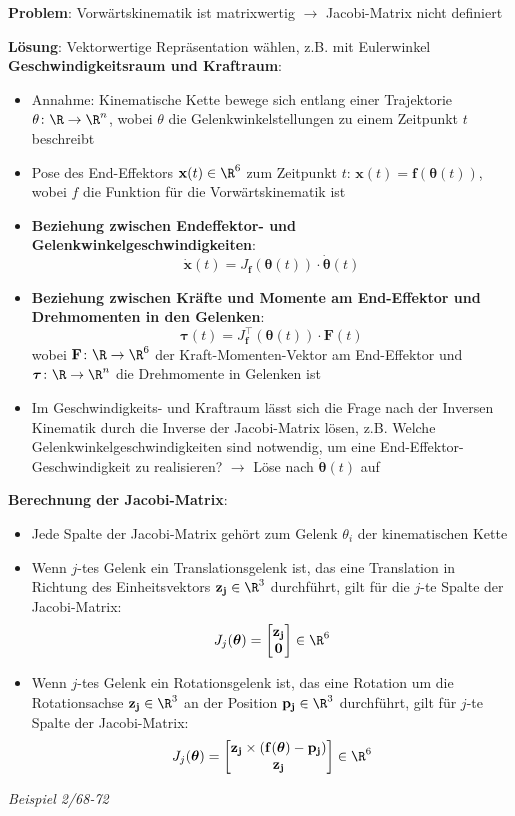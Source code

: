 \textbf{Problem}: Vorwärtskinematik ist matrixwertig $\rightarrow$ Jacobi-Matrix nicht definiert

\textbf{Lösung}: Vektorwertige Repräsentation wählen, z.B. mit Eulerwinkel\\

\textbf{Geschwindigkeitsraum und Kraftraum}:
\begin{itemize}
	\item Annahme: Kinematische Kette bewege sich entlang einer Trajektorie $\theta\colon\R\rightarrow\R^n$, wobei $\theta$ die Gelenkwinkelstellungen zu einem Zeitpunkt $t$ beschreibt
	\item Pose des End-Effektors $\mathbf{x}(t)\in\R^6$ zum Zeitpunkt $t$: $\mathbf{x}(t)=\mathbf{f}(\boldsymbol{\theta}(t))$, wobei $f$ die Funktion für die Vorwärtskinematik ist
	\item \textbf{Beziehung zwischen Endeffektor- und Gelenkwinkelgeschwindigkeiten}: $$\mathbf{\dot{x}}(t)=J_\mathbf{f}(\boldsymbol{\theta}(t))\cdot\boldsymbol{\dot{\theta}}(t)$$
	\item \textbf{Beziehung zwischen Kräfte und Momente am End-Effektor und Drehmomenten in den Gelenken}:
	$$\boldsymbol{\tau}(t)=J_\mathbf{f}^\top(\boldsymbol{\theta}(t))\cdot\mathbf{F}(t)$$
	wobei $\mathbf{F}\colon\R\rightarrow\R^6$ der Kraft-Momenten-Vektor am End-Effektor und $\boldsymbol{\tau}\colon\R\rightarrow\R^n$ die Drehmomente in Gelenken ist
	\item Im Geschwindigkeits- und Kraftraum lässt sich die Frage nach der Inversen Kinematik durch die Inverse der Jacobi-Matrix lösen, z.B. Welche Gelenkwinkelgeschwindigkeiten sind notwendig, um eine End-Effektor-Geschwindigkeit zu realisieren? $\rightarrow$ Löse nach $\boldsymbol{\dot{\theta}}(t)$ auf
\end{itemize}
\bigskip
\textbf{Berechnung der Jacobi-Matrix}:
\begin{itemize}
	\item Jede Spalte der Jacobi-Matrix gehört zum Gelenk $\theta_i$ der kinematischen Kette
	\item Wenn $j$-tes Gelenk ein Translationsgelenk ist, das eine Translation in Richtung des Einheitsvektors $\mathbf{z_j}\in\R^3$ durchführt, gilt für die $j$-te Spalte der Jacobi-Matrix:
	$$J_j(\boldsymbol{\theta})=\left[\begin{matrix}
		\mathbf{z_j} \\
		\mathbf{0}
	\end{matrix}\right]\in\R^6$$
	\item Wenn $j$-tes Gelenk ein Rotationsgelenk ist, das eine Rotation um die Rotationsachse $\mathbf{z_j}\in\R^3$ an der Position $\mathbf{p_j}\in\R^3$ durchführt, gilt für $j$-te Spalte der Jacobi-Matrix:
	$$J_j(\boldsymbol{\theta})=\left[\begin{matrix}
		\mathbf{z_j}\times(\mathbf{f}(\boldsymbol{\theta})-\mathbf{p_j}) \\
		\mathbf{z_j}
	\end{matrix}\right]\in\R^6$$
\end{itemize}

\textit{Beispiel 2/68-72}